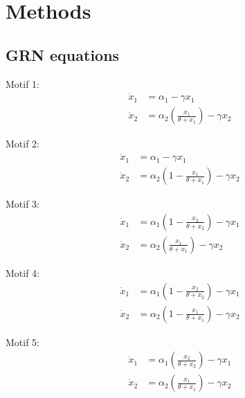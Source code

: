 \section{Methods} \label{methods}

\setcounter{equation}{0}

\subsection{GRN equations}

 
\hspace*{\parindent} Motif 1:
\begin{equation}
\begin{aligned}
\dot{x}_1 &= \alpha_1 - \gamma x_1 \\
\dot{x}_2 &= \alpha_2 \left( \frac{x_1}{\theta + x_1} \right) - \gamma x_2
\end{aligned}
\end{equation}

Motif 2:
\begin{equation}
\begin{aligned}
\dot{x}_1 &= \alpha_1 - \gamma x_1 \\
\dot{x}_2 &= \alpha_2 \left( 1 - \frac{x_1}{\theta + x_1} \right) - \gamma x_2
\end{aligned}
\end{equation}

Motif 3:
\begin{equation}
\begin{aligned}
\dot{x}_1 &= \alpha_1 \left(1 - \frac{x_2}{\theta + x_2} \right) - \gamma x_1\\
\dot{x}_2 &= \alpha_2 \left( \frac{x_1}{\theta + x_1} \right) - \gamma x_2
\end{aligned}
\end{equation}

Motif 4:
\begin{equation}
\begin{aligned}
\dot{x}_1 &= \alpha_1 \left(1 - \frac{x_2}{\theta + x_2} \right) - \gamma x_1\\
\dot{x}_2 &= \alpha_2 \left(1 - \frac{x_1}{\theta + x_1} \right) - \gamma x_2
\end{aligned}
\end{equation}

Motif 5:
\begin{equation}
\begin{aligned}
\dot{x}_1 &= \alpha_1 \left( \frac{x_2}{\theta + x_2} \right) - \gamma x_1\\
\dot{x}_2 &= \alpha_2 \left( \frac{x_1}{\theta + x_1} \right) - \gamma x_2
\end{aligned}
\end{equation}

